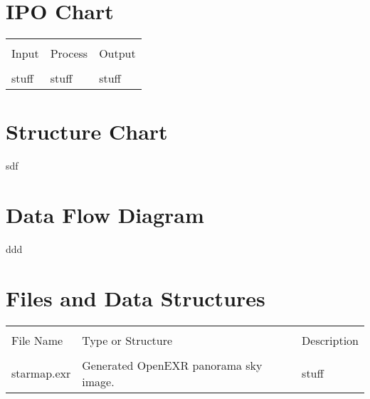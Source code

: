 \documentclass[12pt, DIV=calc]{scrartcl}
\begin{document}
\section{IPO Chart}
\begin{xltabular}[c]{\textwidth}{| X | X | X |}
    \hline \\
Input & Process & Output \\
    \hline \hline \\
stuff & stuff & stuff \\
    \hline
\end{xltabular}


\section{Structure Chart}
sdf


\section{Data Flow Diagram}
ddd
\section{Files and Data Structures}
\begin{xltabular}[c]{\textwidth}{| X | X | X |}
    \hline \\
File Name & Type or Structure & Description \\
    \hline \hline \\
starmap.exr & Generated OpenEXR panorama sky image. & stuff \\
    \hline
\end{xltabular}
\end{document}
